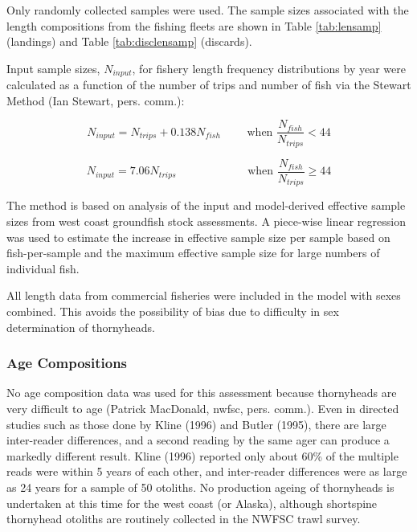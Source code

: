 \documentclass[11pt,
  english,
  letterpaper,
]{article}
\begin{document}
Only randomly collected samples were used. The sample sizes associated with the length compositions from the fishing fleets are shown in Table \ref{tab:lensamp} (landings) and Table \ref{tab:disclensamp} (discards).

Input sample sizes, \({N_{input}}\), for fishery length frequency distributions by year were calculated as a function of the number of trips and number of fish via the Stewart Method (Ian Stewart, pers. comm.):

\begin{equation} {N_{input} = N_{trips} + 0.138N_{fish}}\qquad\text{ when }\frac{N_{fish}}{N_{trips}}<44 \end{equation}

\begin{equation} {N_{input} = 7.06N_{trips}}\qquad\qquad\qquad\text{ when }\frac{N_{fish}}{N_{trips}}\ge 44 \end{equation}

The method is based on analysis of the input and model-derived effective sample sizes from west coast groundfish stock assessments. A piece-wise linear regression was used to estimate the increase in effective sample size per sample based on fish-per-sample and the maximum effective sample size for large numbers of individual fish.

All length data from commercial fisheries were included in the model with sexes combined. This avoids the possibility of bias due to difficulty in sex determination of thornyheads.

\hypertarget{age-compositions}{%
\subsubsection{Age Compositions}\label{age-compositions}}

No age composition data was used for this assessment because thornyheads are very difficult to age (Patrick MacDonald, \gls{nwfsc}, pers. comm.). Even in directed studies such as those done by Kline (1996) and Butler (1995), there are large inter-reader differences, and a second reading by the same ager can produce a markedly different result. Kline (1996) reported only about 60\% of the multiple reads were within 5 years of each other, and inter-reader differences were as large as 24 years for a sample of 50 otoliths. No production ageing of thornyheads is undertaken at this time for the west coast (or Alaska), although shortspine thornyhead otoliths are routinely collected in the NWFSC trawl survey.
\end{document}
